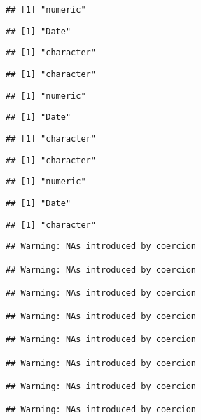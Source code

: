 \documentclass[
]{article}
\begin{document}
\begin{verbatim}
## [1] "numeric"
\end{verbatim}

\begin{verbatim}
## [1] "Date"
\end{verbatim}

\begin{verbatim}
## [1] "character"
\end{verbatim}

\begin{verbatim}
## [1] "character"
\end{verbatim}

\begin{verbatim}
## [1] "numeric"
\end{verbatim}

\begin{verbatim}
## [1] "Date"
\end{verbatim}

\begin{verbatim}
## [1] "character"
\end{verbatim}

\begin{verbatim}
## [1] "character"
\end{verbatim}

\begin{verbatim}
## [1] "numeric"
\end{verbatim}

\begin{verbatim}
## [1] "Date"
\end{verbatim}

\begin{verbatim}
## [1] "character"
\end{verbatim}

\begin{verbatim}
## Warning: NAs introduced by coercion

## Warning: NAs introduced by coercion

## Warning: NAs introduced by coercion

## Warning: NAs introduced by coercion

## Warning: NAs introduced by coercion

## Warning: NAs introduced by coercion

## Warning: NAs introduced by coercion

## Warning: NAs introduced by coercion
\end{verbatim}
\end{document}
